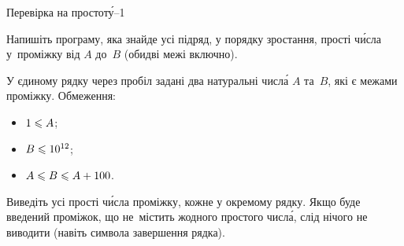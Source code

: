 \begin{problemAllDefault}{Перевірка на простот\'{у}--1}\label{task:check-prime-1}

Напишіть програму, яка знайде усі підряд, у порядку зростання, прості ч\'{и}сла у~проміжку від $A$ до~$B$ (обидві межі включно).

\InputFile
У єдиному рядку через пробіл задані два натуральні числ\'{а} $A$ та~$B$, які є межами проміжку.
Обмеження:

\vspace{-0.5\baselineskip}

\begin{multicols}{3}
\begin{itemize}
\item
$1\leqslant A$;
\item
$B\leqslant10^{12}$;
\item
$A\leqslant B\leqslant A+100$.
\end{itemize}
\end{multicols}

\vspace{-0.5\baselineskip}

\myflfigaw{\hspace*{-1em}\begin{exampleSimple}{2em}{3em}%

\end{exampleSimple}\hspace*{-0.25em}}
\OutputFile
Виведіть усі прості ч\'{и}сла проміжку, кожне у окремому рядку. Якщо буде введений проміжок, що не~містить жодного простого числ\'{а}, слід нічого не виводити (навіть символа завершення рядка).

\end{problemAllDefault}